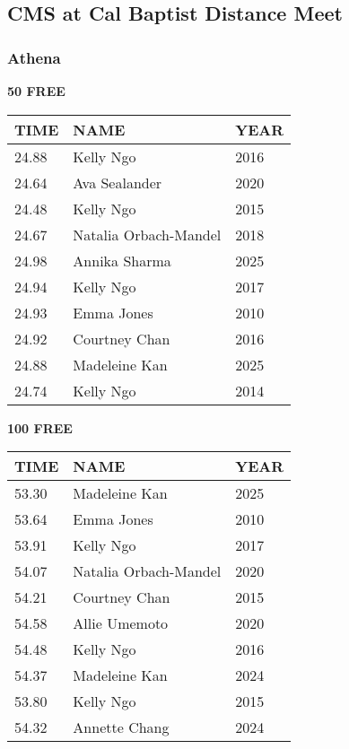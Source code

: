 \vspace{0.4cm}

\newpage

\subsection{CMS at Cal Baptist Distance Meet}
\subsubsection{Athena}

\begin{minipage}[t]{0.48\textwidth}
\centering
\textbf{50 FREE}\\[0.05cm]
\begin{tabular}{@{}p{1.8cm}p{2.8cm}p{1.2cm}@{}}
\hline
\textbf{TIME} & \textbf{NAME} & \textbf{YEAR} \\
\hline
24.88 & Kelly Ngo & 2016 \\
24.64 & Ava Sealander & 2020 \\
24.48 & Kelly Ngo & 2015 \\
24.67 & Natalia Orbach-Mandel & 2018 \\
24.98 & Annika Sharma & 2025 \\
24.94 & Kelly Ngo & 2017 \\
24.93 & Emma Jones & 2010 \\
24.92 & Courtney Chan & 2016 \\
24.88 & Madeleine Kan & 2025 \\
24.74 & Kelly Ngo & 2014 \\
\hline
\end{tabular}
\end{minipage}\hfill
\begin{minipage}[t]{0.48\textwidth}
\centering
\textbf{100 FREE}\\[0.05cm]
\begin{tabular}{@{}p{1.8cm}p{2.8cm}p{1.2cm}@{}}
\hline
\textbf{TIME} & \textbf{NAME} & \textbf{YEAR} \\
\hline
53.30 & Madeleine Kan & 2025 \\
53.64 & Emma Jones & 2010 \\
53.91 & Kelly Ngo & 2017 \\
54.07 & Natalia Orbach-Mandel & 2020 \\
54.21 & Courtney Chan & 2015 \\
54.58 & Allie Umemoto & 2020 \\
54.48 & Kelly Ngo & 2016 \\
54.37 & Madeleine Kan & 2024 \\
53.80 & Kelly Ngo & 2015 \\
54.32 & Annette Chang & 2024 \\
\hline
\end{tabular}
\end{minipage}

